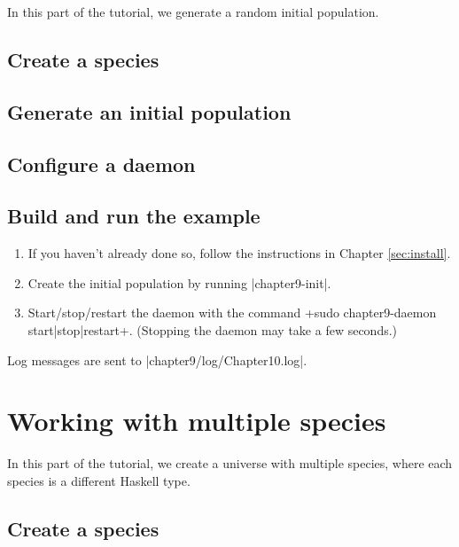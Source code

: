 \documentclass[a4paper,10pt]{report}
\begin{document}
In this part of the tutorial, we generate a random initial population.

\section{Create a species}
\label{sec:species4}



\section{Generate an initial population}
\label{sec:pop4}



\section{Configure a daemon}
\label{sec:daemon4}



\section{Build and run the example}
\label{sec:run4}

\begin{enumerate}
\item If you haven't already done so, follow the instructions in Chapter 
\ref{sec:install}.
\item Create the initial population by running |chapter9-init|.
\item Start/stop/restart the daemon with the command
\UndefineShortVerb{\|}
\DefineShortVerb{\+}
+sudo chapter9-daemon start|stop|restart+.
\UndefineShortVerb{\+}
\DefineShortVerb{\|}
(Stopping the daemon may take a few seconds.)
\end{enumerate}

Log messages are sent to |chapter9/log/Chapter10.log|.

\chapter{Working with multiple species}
\label{sec:multiple}

In this part of the tutorial, we create a universe with multiple species,
where each species is a different Haskell type.

\section{Create a species}
\label{sec:species5}
\end{document}
